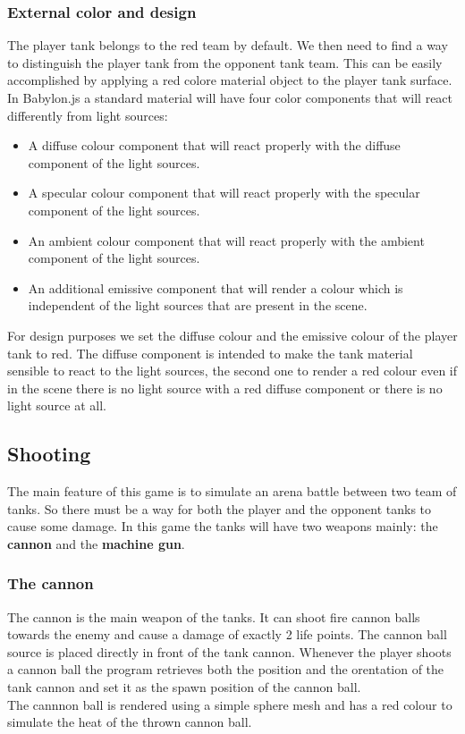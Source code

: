 \documentclass[14pt]{article}
\begin{document}
\subsubsection{External color and design}
The player tank belongs to the red team by default. We then need to find a way to distinguish the player tank from the opponent tank team. This can be easily accomplished by applying a red colore material object to the player tank surface. In Babylon.js a standard material will have four color components that will react differently from light sources: 
\begin{itemize}
\item A diffuse colour component that will react properly with the diffuse component of the light sources.
\item A specular colour component that will react properly with the specular component of the light sources.
\item An ambient colour component that will react properly with the ambient component of the light sources.
\item An additional emissive component that will render a colour which is independent of the light sources that are present in the scene.
\end{itemize}
For design purposes we set the diffuse colour and the emissive colour of the player tank to red. The diffuse component is intended to make the tank material sensible to react to the light sources, the second one to render a red colour even if in the scene there is no light source with a red diffuse component or there is no light source at all.
\subsection{Shooting}
The main feature of this game is to simulate an arena battle between two team of tanks. So there must be a way for both the player and the opponent tanks to cause some damage. In this game the tanks will have two weapons mainly: the \textbf{cannon} and the \textbf{machine gun}.\\
\subsubsection{The cannon}
The cannon is the main weapon of the tanks. It can shoot fire cannon balls towards the enemy and cause a damage of exactly 2 life points. The cannon ball source is placed directly in front of the tank cannon. Whenever the player shoots a cannon ball the program retrieves both the position and the orentation of the tank cannon and set it as the spawn position of the cannon ball. \\
The cannnon ball is rendered using a simple sphere mesh and has a red colour to simulate the heat of the thrown cannon ball. \\
\end{document}
